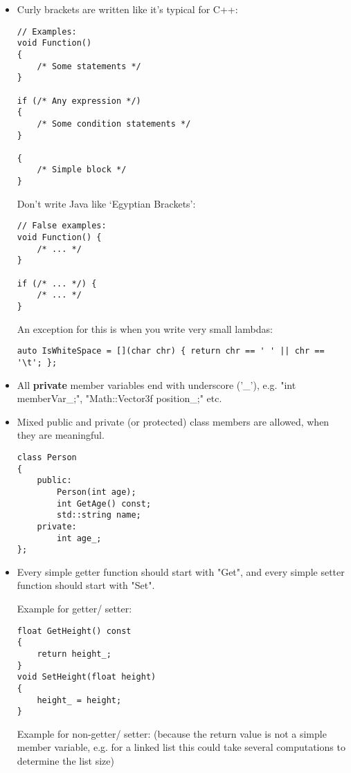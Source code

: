 \documentclass{article}
\begin{document}
\begin{itemize}
\item
Curly brackets are written like it's typical for C++:

\begin{lstlisting}
// Examples:
void Function()
{
	/* Some statements */
}

if (/* Any expression */)
{
	/* Some condition statements */
}

{
	/* Simple block */
}
\end{lstlisting}

Don't write Java like `Egyptian Brackets':

\begin{lstlisting}
// False examples:
void Function() {
	/* ... */
}

if (/* ... */) {
	/* ... */
}
\end{lstlisting}

An exception for this is when you write very small lambdas:

\begin{lstlisting}
auto IsWhiteSpace = [](char chr) { return chr == ' ' || chr == '\t'; };
\end{lstlisting}

\item
All \textbf{private} member variables end with underscore ('\_'), e.g. "int memberVar\_;", "Math::Vector3f position\_;" etc.

\item
Mixed public and private (or protected) class members are allowed, when they are meaningful.

\begin{lstlisting}
class Person
{
	public:
		Person(int age);
		int GetAge() const;
		std::string name;
	private:
		int age_;
};
\end{lstlisting}

\item
Every simple getter function should start with "Get", and every simple setter function should start with "Set".

Example for getter/ setter:

\begin{lstlisting}
float GetHeight() const
{
	return height_;
}
void SetHeight(float height)
{
	height_ = height;
}
\end{lstlisting}

Example for non-getter/ setter: (because the return value is not a simple member variable,
e.g. for a linked list this could take several computations to determine the list size)


\end{itemize}
\end{document}
